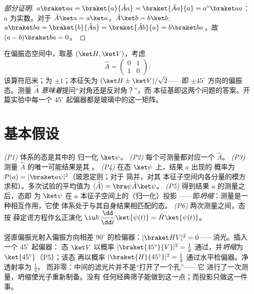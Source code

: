\begin{proof}[部分证明]
$a\braket aa = \braket{a}{\hat Aa} = \braket{\hat Aa}{a} =
a^*\braket aa$：$a$ 为实数。对于 $\hat A\ket a = a\ket a$，$\hat A\ket b
= b\ket b$: $a\braket ba = \braket{b}{\hat Aa} = \braket{\hat
Ab}{a} = b\braket ba$，故 $(a - b)\braket ba = 0$。
\end{proof}

\begin{example}[两能级可观测量]\label{ex:b3:quantum-formalism:twolevel}
在偏振态空间中，取基 $(\ket H, \ket V)$，考虑
\[
\hat A = \begin{pmatrix} 0 & 1\\ 1 & 0\end{pmatrix} :
\]
该算符厄米；为 $\pm1$；本征矢为 $(\ket H \pm
\ket V)/\sqrt2$——即 $\pm45^\circ$ 方向的偏振态。测量
$\hat A$ \emph{意味着}提问“对角还是反对角？”，而
本征基即这两个问题的答案。开篇实验中每一个 $45^\circ$
起偏器都是玻璃中的这一矩阵。
\end{example}

\section{基本假设}

\begin{theorem}[量子力学的规则]\label{thm:b3:quantum-formalism:postulates}
\emph{(P1)} 体系的态是其中的
归一化 $\ket\psi$。
\emph{(P2)} 每个可测量都对应一个
$\hat A$。
\emph{(P3)} 测量 $\hat A$ 的唯一可能结果是其
。
\emph{(P4)} 在态 $\ket\psi$ 上，结果 $a$ 出现的
概率为 $\mathcal P(a) = |\braket a\psi|^2$（玻恩定则；对于
简并，对其
本征子空间内各分量的模方求和）。多次试验的平均值为 $\langle\hat A\rangle =
\bra\psi\hat A\ket\psi$。
\emph{(P5)} 得到结果 $a$ 的测量之后，态即
为 $\ket\psi$ 在 $a$ 本征子空间上的（归一化）投影
——即\emph{坍缩}：测量是一种相互作用，它使
体系处于与其自身结果相匹配的态。
\emph{(P6)} 两次测量之间，态按
薛定谔方程作幺正演化
$\iu\hbar\,\dfrac{\dd}{\dd t}\ket{\psi(t)} = \hat H\ket{\psi(t)}$。
\end{theorem}
\admitted

\begin{example}[三个起偏器的计算]\label{ex:b3:quantum-formalism:threepolarizers}
竖直偏振光射入偏振方向相差 $90^\circ$ 的检偏器：$|\braket
HV|^2 = 0$——消光。插入一个 $45^\circ$ 起偏器：
态 $\ket V$ 以概率 $|\braket{45^\circ}{V}|^2 =
\tfrac12$ 通过，并\emph{坍缩}为 $\ket{45^\circ}$（P5）；该态
再以概率
$|\braket{H}{45^\circ}|^2 = \tfrac12$ 通过水平检偏器。净透射率为 $\tfrac14$，
而非零：中间的滤光片并不是“打开了一个孔”——它
进行了一次测量，坍缩使光子重新制备。没有
任何经典筛子能做到这一点；而投影只做这一件事。
\end{example}

